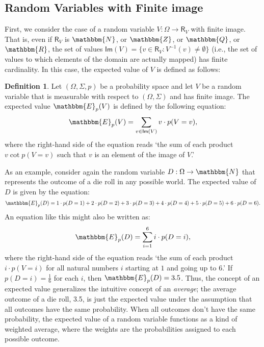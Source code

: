 \documentclass[11pt]{article}
\theoremstyle{definition}
\newtheorem{definition}[theorem]{Definition}
\theoremstyle{remark}
\begin{document}
\subsection{Random Variables with Finite image}
First, we consider the case of a random variable $V:\Omega\rightarrow\textsf{R}_{V}$ with finite image. That is, even if $\textsf{R}_{V}$ is $\mathbbm{N}$, or $\mathbbm{Z}$, or $\mathbbm{Q}$, or $\mathbbm{R}$, the set of values $\textsf{Im}(V)=\{v\in \textsf{R}_{V}:V^{-1}(v)\neq\emptyset\}$  (i.e., the set of values to which elements of the domain are actually mapped) has finite cardinality. In this case, the expected value of $V$ is defined as follows:
\begin{definition}\label{def:evfin}
    Let $(\Omega,\Sigma,p)$ be a probability space and let $V$ be a random variable that is measurable with respect to $(\Omega,\Sigma)$ and has finite image. The expected value $\mathbbm{E}_{p}(V)$ is defined by the following equation:
    $$\mathbbm{E}_{p}(V)=\sum_{v\in\textsf{Im}(V)}v\cdot p(V=v),$$
    where the right-hand side of the equation reads `the sum of each product $v\cot p(V=v)$ such that $v$ is an element of the image of $V$.' 
\end{definition}
\noindent
As an example, consider again the random variable $D:\Omega\rightarrow\mathbbm{N}$ that represents the outcome of a die roll in any possible world. The expected value of $D$ is given by the equation:
$$\mathbbm{E}_{p}(D)=1\cdot p(D=1) + 2\cdot p(D=2) + 3\cdot p(D=3) + 4\cdot p(D=4) + 5\cdot p(D=5) + 6\cdot p(D=6).$$
An equation like this might also be written as:
$$\mathbbm{E}_{p}(D)=\sum_{i=1}^{6}i\cdot p(D=i),$$
where the right-hand side of the equation reads `the sum of each product $i\cdot p(V=i)$ for all natural numbers $i$ starting at $1$ and going up to $6$.' If $p(D=i)=\frac{1}{6}$ for each $i$, then $\mathbbm{E}_{p}(D)=3.5$. Thus, the concept of an expected value generalizes the intuitive concept of an \textit{average}; the average outcome of a die roll, 3.5, is just the expected value under the assumption that all outcomes have the same probability. When all outcomes don't have the same probability, the expected value of a random variable functions as a kind of weighted average, where the weights are the probabilities assigned to each possible outcome.\par
\end{document}
